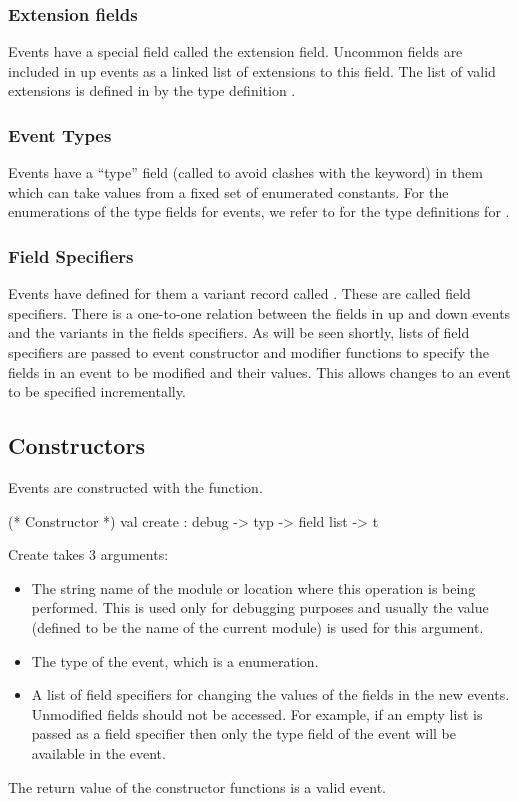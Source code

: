 \subsubsection{Extension fields}
Events have a special field called the extension field.  Uncommon
fields are included in up events as a linked list of extensions to
this field.  The list of valid extensions is defined in
 by the type definition .

\subsubsection{Event Types}
Events have a ``type'' field (called  to avoid clashes with
the  keyword) in them which can take values from a fixed
set of enumerated constants.  For the enumerations of the type fields
for events, we refer to  for the type
definitions for .

\subsubsection{Field Specifiers}
Events have defined for them a variant record called .
These are called field specifiers.  There is a one-to-one relation
between the fields in up and down events and the variants in the
fields specifiers.  As will be seen shortly, lists of field specifiers
are passed to event constructor and modifier functions to specify the
fields in an event to be modified and their values.  This allows
changes to an event to be specified incrementally.

\subsection{Constructors}
Events are constructed with the  function.

\begin{codebox}
  (* Constructor *)
val create	: debug -> typ -> field list -> t
\end{codebox}

Create takes 3 arguments:
\begin{itemize}
\item
The string name of the module or location where this operation is being
performed.  This is used only for debugging purposes and usually the value
 (defined to be the name of the current module) is used for
this argument.
\item
The type of the event, which is a  enumeration.
\item
A list of field specifiers for changing the values of the fields in the new
events.  Unmodified fields should not be accessed.  For example, if an empty
list is passed as a field specifier then only the type field of the event will
be available in the event.
\end{itemize}
The return value of the constructor functions is a valid event.


